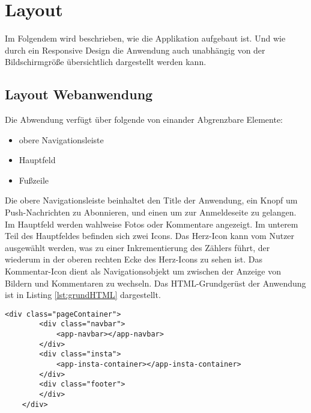\chapter{Layout}

Im Folgendem wird beschrieben, wie die Applikation aufgebaut ist. Und wie durch ein Responsive Design die Anwendung auch unabhängig von der Bildschirmgröße übersichtlich dargestellt werden kann. 

\section{Layout Webanwendung}
Die Abwendung verfügt über folgende von einander Abgrenzbare Elemente: 
\begin{itemize}
    \item obere Navigationsleiste
    \item Hauptfeld
    \item Fußzeile
\end{itemize}

Die obere Navigationsleiste beinhaltet den Title der Anwendung, ein Knopf um Push-Nachrichten zu Abonnieren, und einen um zur Anmeldeseite zu gelangen. Im Hauptfeld werden wahlweise Fotos oder Kommentare angezeigt. Im unterem Teil des Hauptfeldes befinden sich zwei Icons. Das Herz-Icon kann vom Nutzer ausgewählt werden, was zu einer Inkrementierung des Zählers führt, der wiederum in der oberen rechten Ecke des Herz-Icons zu sehen ist. Das Kommentar-Icon dient als Navigationsobjekt um zwischen der Anzeige von Bildern und Kommentaren zu wechseln. Das HTML-Grundgerüst der Anwendung ist in Listing \ref{lst:grundHTML} dargestellt. 

\begin{lstlisting}[caption={HTML-Grundgerüst der Webanwendung}, label=lst:grundHTML]
    <div class="pageContainer">
        <div class="navbar">
            <app-navbar></app-navbar>
        </div>
        <div class="insta">
            <app-insta-container></app-insta-container>
        </div>
        <div class="footer">
        </div>
    </div>
\end{lstlisting}

